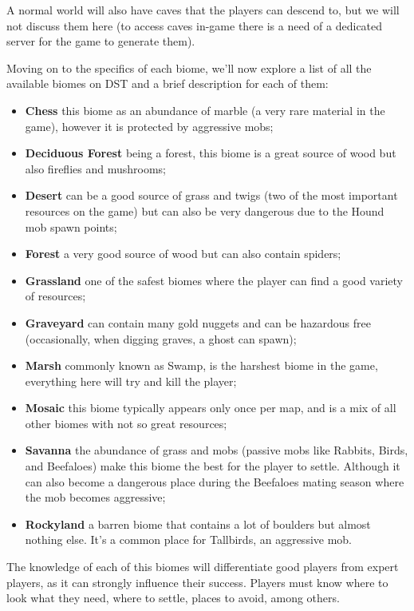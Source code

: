 A normal world will also have caves that the players can descend to, but we will not discuss them here (to access caves in-game there is a need of a dedicated server for the game to generate them).

Moving on to the specifics of each biome, we'll now explore a list of all the available biomes on \ac{DST} and a brief description for each of them:

\begin{itemize}
\item \textbf{Chess} this biome as an abundance of marble (a very rare material in the game), however it is protected by aggressive mobs;
\item \textbf{Deciduous Forest} being a forest, this biome is a great source of wood but also fireflies and mushrooms;
\item \textbf{Desert} can be a good source of grass and twigs (two of the most important resources on the game) but can also be very dangerous due to the Hound mob spawn points;
\item \textbf{Forest} a very good source of wood but can also contain spiders;
\item \textbf{Grassland} one of the safest biomes where the player can find a good variety of resources;
\item \textbf{Graveyard} can contain many gold nuggets and can be hazardous free (occasionally, when digging graves, a ghost can spawn);
\item \textbf{Marsh} commonly known as Swamp, is the harshest biome in the game, everything here will try and kill the player;
\item \textbf{Mosaic} this biome typically appears only once per map, and is a mix of all other biomes with not so great resources;
\item \textbf{Savanna} the abundance of grass and mobs (passive mobs like Rabbits, Birds, and Beefaloes) make this biome the best for the player to settle.
Although it can also become a dangerous place during the Beefaloes mating season where the mob becomes aggressive;
\item \textbf{Rockyland} a barren biome that contains a lot of boulders but almost nothing else. It’s a common place for Tallbirds, an aggressive mob.
\end{itemize}

The knowledge of each of this biomes will differentiate good players from expert players, as it can strongly influence their success.
Players must know where to look what they need, where to settle, places to avoid, among others.

